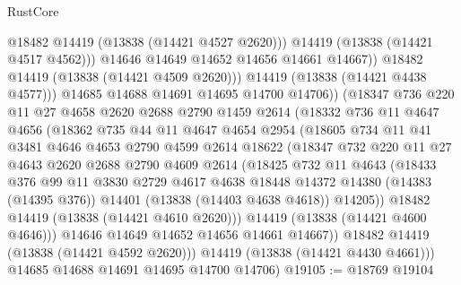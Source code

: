 \begin{lexlean}{RustCore}
\begin{coremodule}
                        @18482
                        @14419
                        (@13838 (@14421 @4527 @2620)))
                      @14419
                      (@13838 (@14421 @4517 @4562)))
                    @14646
                    @14649
                    @14652
                    @14656
                    @14661
                    @14667))
                @18482
                @14419
                (@13838 (@14421 @4509 @2620)))
              @14419
              (@13838 (@14421 @4438 @4577)))
            @14685
            @14688
            @14691
            @14695
            @14700
            @14706))
        (@18347
          @736
          @220
          @11
          @27
          @4658
          @2620
          @2688
          @2790
          @1459
          @2614
          (@18332
            @736
            @11
            @4647
            @4656
            (@18362
              @735
              @44
              @11
              @4647
              @4654
              @2954
              (@18605
                @734
                @11
                @41
                @3481
                @4646
                @4653
                @2790
                @4599
                @2614
                @18622
                (@18347
                  @732
                  @220
                  @11
                  @27
                  @4643
                  @2620
                  @2688
                  @2790
                  @4609
                  @2614
                  (@18425
                    @732
                    @11
                    @4643
                    (@18433
                      @376
                      @99
                      @11
                      @3830
                      @2729
                      @4617
                      @4638
                      @18448
                      @14372
                      @14380
                      (@14383 (@14395 @376))
                      @14401
                      (@13838 (@14403 @4638 @4618))
                      @14205))
                  @18482
                  @14419
                  (@13838 (@14421 @4610 @2620)))
                @14419
                (@13838 (@14421 @4600 @4646)))
              @14646
              @14649
              @14652
              @14656
              @14661
              @14667))
          @18482
          @14419
          (@13838 (@14421 @4592 @2620)))
        @14419
        (@13838 (@14421 @4430 @4661)))
      @14685
      @14688
      @14691
      @14695
      @14700
      @14706)
@19105 := @18769 @19104

\end{coremodule}
\end{lexlean}
